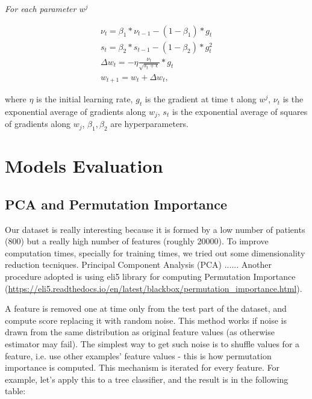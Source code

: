 \documentclass{article}
\begin{document}
\textit{For each parameter $w^{j}$}

\begin{align*}\nu_{t}  = \beta_{1}  *  \nu_{t-1} - (1 - \beta_{1}) *g_{t} \\
s_{t} =  \beta_{2} * s_{t-1} - (1-\beta_{2}) * g_{t}^2\\
\Delta w_{t} = -\eta \frac{\nu_{t}}{\sqrt{s_{t} + \epsilon}}* g_{t}\\
w_{t+1} = w_{t} + \Delta w_{t},
\end{align*}

where $\eta$ is the initial learning rate, $g_{t}$ is the gradient at time t along $w^{j}$, $\nu_{t}$ is the exponential average of gradients along $w_{j}$, $s_{t}$ is the exponential average of squares of gradients along $w_{j}$, $\beta_{1},\beta_{2}$ are hyperparameters.


\section{Models Evaluation}


\subsection{PCA and Permutation Importance}

Our dataset is really interesting because it is formed by a low number of patients (800) but a really high number of features (roughly 20000). To improve computation times, specially for training times, we tried out some dimensionality reduction tecniques.
Principal Component Analysis (PCA) ......
Another procedure adopted is using eli5 library for computing Permutation Importance (\url{https://eli5.readthedocs.io/en/latest/blackbox/permutation_importance.html}).

A feature is removed one at time only from the test part of the dataset, and compute score replacing it with random noise. This method works if noise is drawn from the same distribution as original feature values (as otherwise estimator may fail). The simplest way to get such noise is to shuffle values for a feature, i.e. use other examples’ feature values - this is how permutation importance is computed.
This mechanism is iterated for every feature. For example, let's apply this to a tree classifier, and the result is in the following table:
\end{document}
